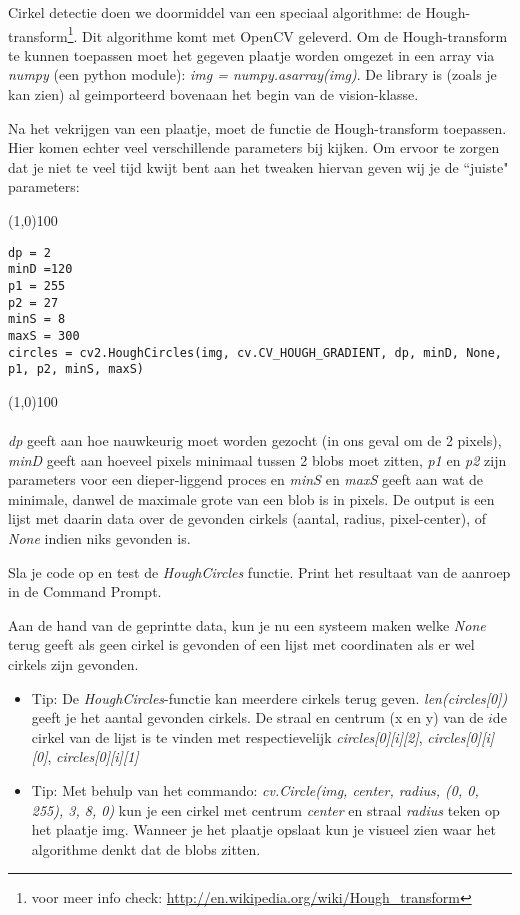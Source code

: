 \documentclass[a4paper]{article}
\begin{document}
Cirkel detectie doen we doormiddel van een speciaal algorithme: de Hough-transform\footnote{voor meer info check: \url{http://en.wikipedia.org/wiki/Hough_transform}}. Dit algorithme komt met OpenCV geleverd. Om de Hough-transform te kunnen toepassen moet het gegeven plaatje worden omgezet in een array via \textit{numpy} (een python module): \textit{img = numpy.asarray(img)}. De library is (zoals je kan zien) al geimporteerd bovenaan het begin van de vision-klasse.

Na het vekrijgen van een plaatje, moet de functie de Hough-transform toepassen. Hier komen echter veel verschillende parameters bij kijken. Om ervoor te zorgen dat je niet te veel tijd kwijt bent aan het tweaken hiervan geven wij je de ``juiste" parameters:

\noindent \line(1,0){100}
\begin{verbatim}
dp = 2
minD =120
p1 = 255
p2 = 27
minS = 8
maxS = 300
circles = cv2.HoughCircles(img, cv.CV_HOUGH_GRADIENT, dp, minD, None, p1, p2, minS, maxS)
\end{verbatim}
\noindent \line(1,0){100}
\\\\
\textit{dp} geeft aan hoe nauwkeurig moet worden gezocht (in ons geval om de 2 pixels), \textit{minD} geeft aan hoeveel pixels minimaal tussen 2 blobs moet zitten, \textit{p1} en \textit{p2} zijn parameters voor een dieper-liggend proces en \textit{minS} en \textit{maxS} geeft aan wat de minimale, danwel de maximale grote van een blob is in pixels.
De output is een lijst met daarin data over de gevonden cirkels (aantal, radius, pixel-center), of \textit{None} indien niks gevonden is.

Sla je code op en test de \textit{HoughCircles} functie. Print het resultaat van de aanroep in de Command Prompt. 

Aan de hand van de geprintte data, kun je nu een systeem maken welke \textit{None} terug geeft als geen cirkel is gevonden of een lijst met coordinaten als er wel cirkels zijn gevonden.

\begin{itemize}
\item Tip: De \textit{HoughCircles}-functie kan meerdere cirkels terug geven. \textit{len(circles[0])} geeft je het aantal gevonden cirkels. De straal en centrum (x en y) van de $i${de} cirkel van de lijst is te vinden met respectievelijk \textit{circles[0][i][2]}, \textit{circles[0][i][0]}, \textit{circles[0][i][1]}
\item Tip: Met behulp van het commando: \textit{cv.Circle(img, center, radius, (0, 0, 255), 3, 8, 0)} kun je een cirkel met centrum \textit{center} en straal \textit{radius} teken op het plaatje img. Wanneer je het plaatje opslaat kun je visueel zien waar het algorithme denkt dat de blobs zitten.
\end{itemize}
\end{document}

